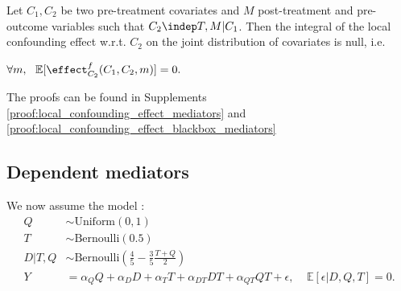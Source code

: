 \vspace*{-11pt}
\begin{corollary} \label{cor:local_confounding_effect_blackbox_mediators}
 Let $C_1, C_2$ be two pre-treatment covariates and $M$ post-treatment and pre-outcome variables such that $C_2 \indep T, M | C_1$. Then the integral of the local confounding effect w.r.t. $C_2$ on the joint distribution of covariates is null, i.e.
\centerline{ $\forall m, \ \ \mathbb{E}[\effect^{f}_{C_2}(C_1,C_2,m)] = 0.$ }
\end{corollary}
\vspace{-11pt}
The proofs can be found in Supplements \ref{proof:local_confounding_effect_mediators} and \ref{proof:local_confounding_effect_blackbox_mediators}

\subsection{Dependent mediators}

We now assume the model :
\begin{align*}
    Q &\sim \text{Uniform}(0,1) \\
    T &\sim \text{Bernoulli}(0.5) \\
    D|T,Q &\sim \text{Bernoulli}(\frac{4}{5} - \frac{3}{5}\frac{T+Q}{2}) \\
    Y &= \alpha_Q Q + \alpha_D D + \alpha_T T + \alpha_{DT} DT + \alpha_{QT} QT + \epsilon, \ \ \ \ \ \mathbb{E}[\epsilon | D, Q, T] = 0.
\end{align*}

